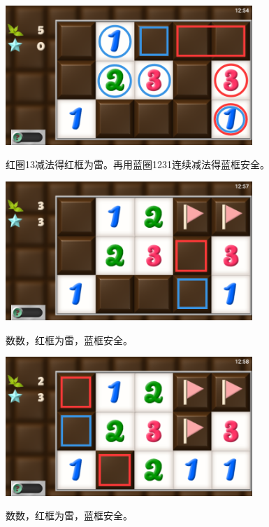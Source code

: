\subsection{} %
\begin{center}
    \includegraphics[width=0.7\textwidth]{puzzle/23-1.png}
\end{center}
红圈13减法得红框为雷。再用蓝圈1231连续减法得蓝框安全。
\begin{center}
    \includegraphics[width=0.7\textwidth]{puzzle/23-2.png}
\end{center}
数数，红框为雷，蓝框安全。
\begin{center}
    \includegraphics[width=0.7\textwidth]{puzzle/23-3.png}
\end{center}
数数，红框为雷，蓝框安全。

